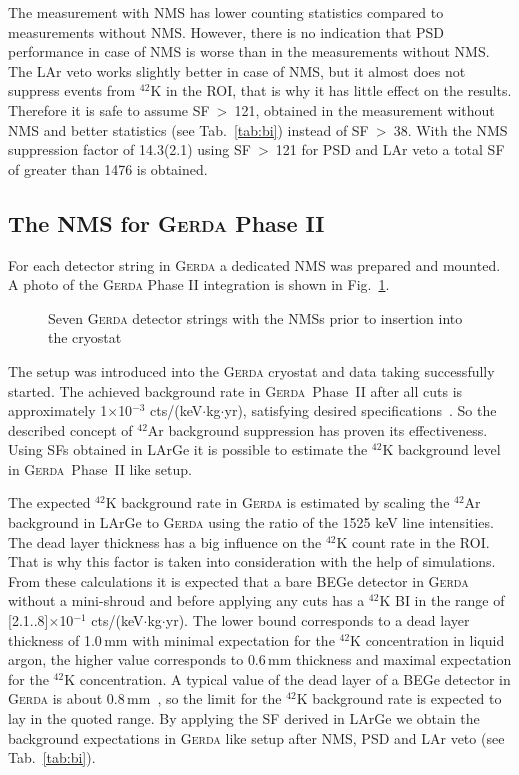 \documentclass[twocolumn,epjc3]{svjour3}
\newcommand{\ctsper} {{cts/(keV\(\cdot\)kg\(\cdot\)yr)}}
\newcommand{\Gerda} {{\textsc{Gerda}\xspace}}
\newcommand{\LArGe} {{{LArGe}\xspace}}
\newcommand{\I}[2]{$^{#1}$#2}
\begin{document}
The measurement with NMS has lower counting statistics compared to measurements without NMS. However, there is no indication that PSD performance in case of NMS is worse than in the measurements without NMS. The LAr veto works slightly better in case of NMS, but it almost does not suppress events from \I{42}{K} in the ROI, that is why it has little effect on the results. Therefore it is safe to assume SF~\textgreater~121, obtained in the measurement without NMS and better statistics (see Tab.~\ref{tab:bi}) instead of SF~\textgreater~38. With the NMS suppression factor of 14.3(2.1) using SF~\textgreater~121 for PSD and LAr veto a total SF of greater than 1476 is obtained.  

%
\subsection{The NMS for \Gerda{} Phase II}
\label{sec:nmsGERDA}
%
For each detector string in \Gerda{} a dedicated NMS was prepared and mounted. A photo of the \Gerda{} Phase II integration is shown in Fig.~\ref{fig:nms_GERDA}. 
\begin{figure}
  \begin{center}
    \caption{\label{fig:nms_GERDA}Seven \Gerda{} detector strings with the NMSs prior to insertion into the cryostat}
  \end{center}
\end{figure}
% 
The setup was introduced into the \Gerda{} cryostat and data taking successfully started. The achieved background rate in \Gerda{}~Phase~II after all cuts is approximately 1$\times$10$^{-3}$ \ctsper, satisfying desired specifications~\cite{gerda_nature}. So the described concept of \I{42}{Ar} background suppression has proven its effectiveness. Using SFs obtained in \LArGe{} it is possible to estimate the \I{42}{K} background level in \Gerda{}~Phase~II like setup. 

The expected \I{42}{K} background rate in \Gerda{} is estimated by scaling the \I{42}{Ar} background in \LArGe{} to \Gerda{} using the ratio of the 1525 keV line intensities. The dead layer thickness has a big influence on the \I{42}{K} count rate in the ROI. That is why this factor is taken into consideration with the help of simulations. From these calculations it is expected that a bare BEGe detector in \Gerda{} without a mini-shroud and before applying any cuts has a \I{42}{K} BI in the range of [2.1..8]$\times$10$^{-1}$ \ctsper. The lower bound corresponds to a dead layer thickness of 1.0\,mm with minimal expectation for the \I{42}{K} concentration in liquid argon, the higher value corresponds to 0.6\,mm thickness and maximal expectation for the \I{42}{K} concentration. A typical value of the dead layer of a BEGe detector in \Gerda{} is about 0.8\,mm~\cite{GERDAbkg}, so the limit for the \I{42}{K} background rate is expected to lay in the quoted range. By applying the SF derived in \LArGe{} we obtain the background expectations in \Gerda{} like setup after NMS, PSD and LAr veto (see Tab.~\ref{tab:bi}).
\end{document}

